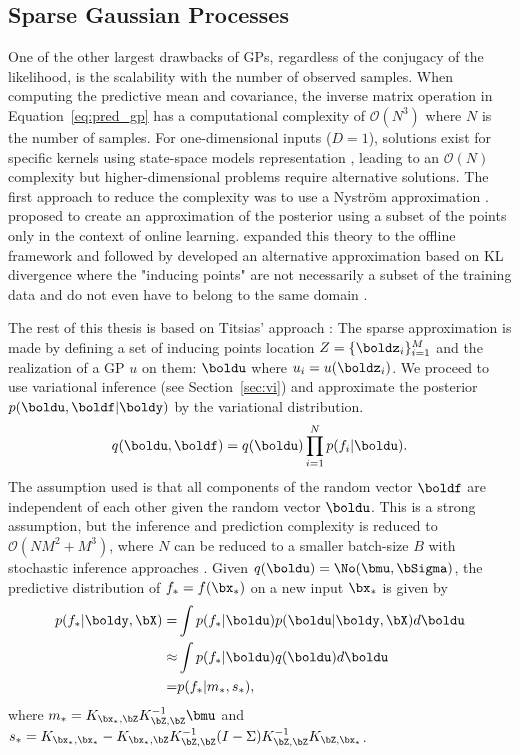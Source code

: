 \subsection{Sparse Gaussian Processes}
\label{sec:sparsegps}
One of the other largest drawbacks of \ac{GPs}, regardless of the conjugacy of the likelihood, is the scalability with the number of observed samples.
When computing the predictive mean and covariance, the inverse matrix operation in Equation~\ref{eq:pred_gp} has a computational complexity of $\mathcal{O}(N^3)$ where $N$ is the number of samples.
For one-dimensional inputs ($D=1$), solutions exist for specific kernels using state-space models representation \cite{pmlr-v9-turner10a,solinInfiniteHorizonGaussianProcesses2018}, leading to an $\mathcal{O}(N)$ complexity but higher-dimensional problems require alternative solutions.
The first approach to reduce the complexity was to use a Nystr\"om approximation \cite{williams2002observations}.
\citet{csato2002sparse} proposed to create an approximation of the posterior using a subset of the points only in the context of online learning.
\citet{snelsonSparseGaussianProcesses2009} expanded this theory to the offline framework and \citet{csato2002gaussian} followed by \citet{Titsias2009} developed an alternative approximation based on KL divergence where the "inducing points" are not necessarily a subset of the training data and do not even have to belong to the same domain \cite{NIPS2009_5ea1649a, vdw2020framework}.

The rest of this thesis is based on Titsias' approach \cite{Titsias2009}:
The sparse approximation is made by defining a set of inducing points location $Z=\{\boldz_i\}_{i=1}^M$ and the realization of a \ac{GP} $u$ on them: $\boldu$ where $u_i = u(\boldz_i)$.
We proceed to use variational inference (see Section~\ref{sec:vi}) and approximate the posterior $p(\boldu,\boldf|\boldy)$ by the variational distribution.
\begin{align}
    q(\boldu,\boldf) = q(\boldu)\prod_{i=1}^N p(f_i|\boldu).
    \label{eq:titsias_assumption}
\end{align}
The assumption used is that all components of the random vector $\boldf$ are independent of each other given the random vector $\boldu$.
This is a strong assumption, but the inference and prediction complexity is reduced to $\mathcal{O}(NM^2 + M^3)$, where $N$ can be reduced to a smaller batch-size $B$ with stochastic inference approaches \cite{Hensman2013,Hensman2015}.
Given $q(\boldu) = \No(\bmu,\bSigma)$, the predictive distribution of $f_*=f(\bx_*)$ on a new input $\bx_*$ is given by
\begin{align*}
    p(f_*|\boldy,\bX) =& \int p(f_*|\boldu) p(\boldu|\boldy,\bX)d\boldu\\
    \approx& \int p(f_*|\boldu) q(\boldu)d\boldu\\
    =& p(f_*|m_*,s_*),
\end{align*}
where $m_* = K_{\bx_*,\bZ} K^{-1}_{\bZ,\bZ} \bmu$ and $s_* = K_{\bx_*,\bx_*} - K_{\bx_*,\bZ}K_{\bZ,\bZ}^{-1}(I - \Sigma) K^{-1}_{\bZ,\bZ}K_{\bZ,\bx_*}$.

